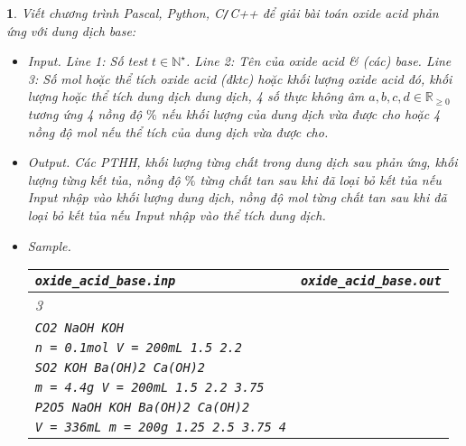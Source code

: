 \documentclass{article}
\newtheorem{baitoan}{}
\begin{document}
\begin{baitoan}
	Viết chương trình {\sf Pascal, Python, C{\tt/}C++} để giải bài toán oxide acid phản ứng với dung dịch base:
	\begin{itemize}
		\item {\sf Input.} Line 1: Số test $t\in\mathbb{N}^\star$. Line 2: Tên của oxide acid \& (các) base. Line 3: Số mol hoặc thể tích oxide acid (đktc) hoặc khối lượng oxide acid đó, khối lượng hoặc thể tích dung dịch dung dịch, 4 số thực không âm $a,b,c,d\in\mathbb{R}_{\ge0}$ tương ứng 4  nồng độ $\%$ nếu khối lượng của dung dịch vừa được cho hoặc 4 nồng độ mol nếu thể tích của dung dịch vừa được cho.
		\item {\sf Output.} Các {\rm PTHH}, khối lượng từng chất trong dung dịch sau phản ứng, khối lượng từng kết tủa, nồng độ $\%$ từng chất tan sau khi đã loại bỏ kết tủa nếu Input nhập vào khối lượng dung dịch, nồng độ mol từng chất tan sau khi đã loại bỏ kết tủa nếu Input nhập vào thể tích dung dịch.
		\item {\sf Sample.}
		\begin{table}[H]
			\centering
			\begin{tabular}{|l|l|}
				\hline
				\verb|oxide_acid_base.inp| & \verb|oxide_acid_base.out| \\
				\hline
				3 &  \\
				{\tt CO2 NaOH KOH} &  \\
				{\tt n = 0.1mol V = 200mL 1.5 2.2} &  \\
				{\tt SO2 KOH Ba(OH)2 Ca(OH)2} &  \\
				{\tt m = 4.4g V = 200mL 1.5 2.2 3.75} &  \\
				{\tt P2O5 NaOH KOH Ba(OH)2 Ca(OH)2}&  \\
				{\tt V = 336mL m = 200g 1.25 2.5 3.75 4}&  \\
				\hline
			\end{tabular}
		\end{table}		
	\end{itemize}
\end{baitoan}


\printbibliography[heading=bibintoc]
\end{document}
